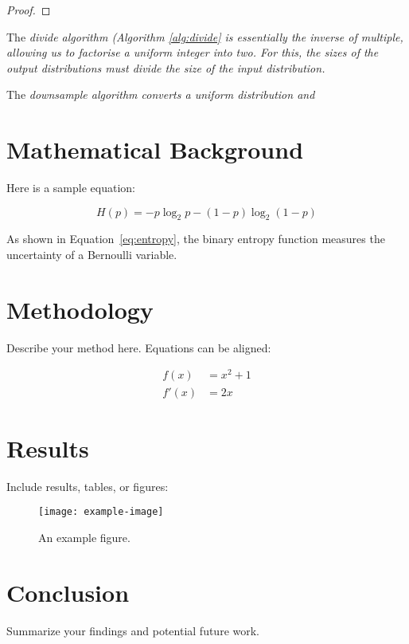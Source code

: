 \documentclass[12pt]{article}
\begin{document}
\begin{proof}
\end{proof}

The \em divide \em algorithm (Algorithm \ref{alg:divide} is essentially the inverse of multiple, allowing us to factorise a uniform integer into two. For this, the sizes of the output distributions must divide the size of the input distribution.

The \em downsample \em algorithm converts a uniform distribution and 

\section{Mathematical Background}

Here is a sample equation:

\begin{equation}
H(p) = -p \log_2 p - (1 - p) \log_2(1 - p)
\label{eq:entropy}
\end{equation}

As shown in Equation~\ref{eq:entropy}, the binary entropy function measures the uncertainty of a Bernoulli variable.

\section{Methodology}

Describe your method here. Equations can be aligned:

\begin{align}
f(x) &= x^2 + 1 \\
f'(x) &= 2x
\end{align}

\section{Results}

Include results, tables, or figures:

\begin{figure}[h]
\centering
\texttt{[image: example-image]}
\caption{An example figure.}
\label{fig:example}
\end{figure}

\section{Conclusion}

Summarize your findings and potential future work.

\printbibliography
\end{document}
